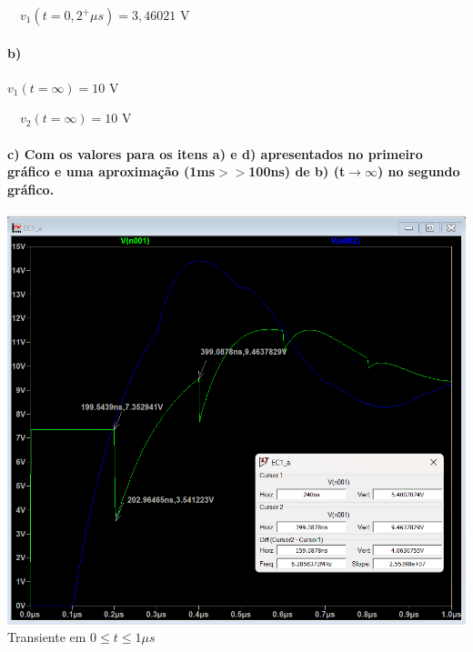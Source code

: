 \documentclass[12pt,a4paper]{article}
\begin{document}
\ \ $v_1(t=0,2^+\mu s) = 3,46021$ V

\paragraph{b)}

$v_1(t=\infty) = 10$ V

\ \ $v_2(t=\infty) = 10$ V


\paragraph{c) Com os valores para os itens a) e d) apresentados no primeiro gráfico e uma aproximação (1ms$>>$100ns) de b) (t$\rightarrow \infty$) no segundo gráfico.}

\begin{center}
    \includegraphics[scale=0.5]{Q1 item c 1.png}\\
    
    \small{Transiente em $0 \le t \le 1\mu s$}\\
    

\end{center}
\end{document}
